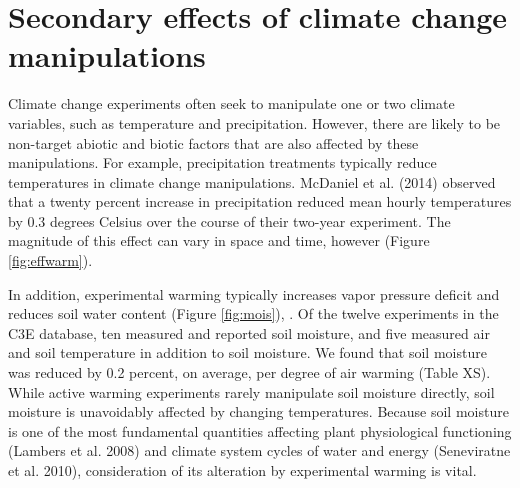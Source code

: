 \documentclass{article}
\begin{document}
\section* {Secondary effects of climate change manipulations}
Climate change experiments often seek to manipulate one or two climate variables, such as temperature and precipitation. However, there are likely to be non-target abiotic and biotic factors that are also affected by these manipulations. For example, precipitation treatments typically reduce temperatures in climate change manipulations\citep{sherry2007,rollinson2012,mcdaniel2014}. McDaniel et al. (2014) observed that a twenty percent increase in precipitation reduced mean hourly temperatures by 0.3 degrees Celsius over the course of their two-year experiment. The magnitude of this effect can vary in space and time, however (Figure \ref{fig:effwarm}). 
\par In addition, experimental warming typically increases vapor pressure deficit and reduces soil water content (Figure \ref{fig:mois}), \citep[e.g.,][]{sherry2007,morin2010,templer2016}. Of the twelve experiments in the C3E database, ten measured and reported soil moisture, and five measured air and soil temperature in addition to soil moisture. We found that soil moisture was reduced by 0.2 percent, on average, per degree of air warming (Table XS). While active warming experiments rarely manipulate soil moisture directly, soil moisture is unavoidably affected by changing temperatures. Because soil moisture is one of the most fundamental quantities affecting plant physiological functioning (Lambers et al. 2008) and climate system cycles of water and energy (Seneviratne et al. 2010), consideration of its alteration by experimental warming is vital. 
\end{document}
